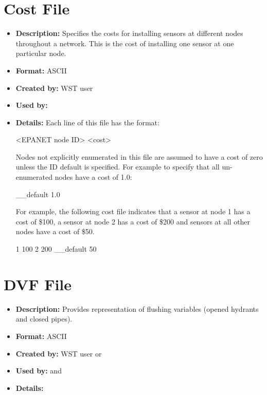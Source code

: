 \section{Cost File}\label{formats_costFile}
\begin{itemize}
\item {\bfseries Description:} Specifies the costs for installing sensors at 
different nodes throughout a network. This is the cost of installing one sensor 
at one particular node. 
\item {\bfseries Format:} ASCII 
\item {\bfseries Created by:} WST user 
\item {\bfseries Used by:}  
\item {\bfseries Details:} Each line of this file has the format:
\begin{unknownListing}
   <EPANET node ID> <cost>
\end{unknownListing}
Nodes not explicitly enumerated in this file are assumed to have a cost of zero 
unless the ID \code{\_\_}default is specified. For example to specify that 
all un-\/enumerated nodes have a cost of 1.0:
\begin{unknownListing}
   __default 1.0
\end{unknownListing}

For example, the following cost file indicates that a sensor at node 1 has a cost of \$100, a sensor at node 2 has a cost of \$200 and sensors at all other nodes have a cost of \$50.
\begin{unknownListing}
     1       100
     2       200
   __default 50
\end{unknownListing}
\end{itemize}

\section{DVF File}\label{formats_dvfFile} 
\begin{itemize} 
\item {\bfseries Description:} Provides representation of flushing variables (opened hydrants and closed pipes).
\item {\bfseries Format:} ASCII 
\item {\bfseries Created by:} WST user or 
\item {\bfseries Used by:}  and 
\item {\bfseries Details:}
\end{itemize} 
\fi

